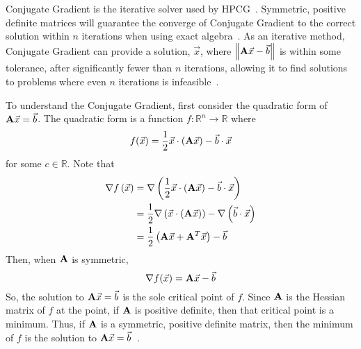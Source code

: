 Conjugate Gradient is the iterative solver used by HPCG~\cite{Dongarra:2015:HPCG}.
Symmetric, positive definite matrices will guarantee the converge of Conjugate Gradient to the correct solution within \(n\) iterations when using exact algebra~\cite{Saad:2003:IterativeMethods}.
As an iterative method, Conjugate Gradient can provide a solution, \(\vec{x}\), where \(\left\|\mathbf{A}\vec{x}-\vec{b}\right\|\) is within some tolerance, after significantly fewer than \(n\) iterations, allowing it to find solutions to problems where even \(n\) iterations is infeasible~\cite{Shewchuk:1994:IntroToCG}.

To understand the Conjugate Gradient, first consider the quadratic form of \(\mathbf{A}\vec{x} = \vec{b}\).
The quadratic form is a function \(f:\mathbb{R}^n\to\mathbb{R}\) where
\begin{equation}
\label{eq:quad-form}
	f(\vec{x}) = \frac{1}{2}\vec{x}\cdot\left(\mathbf{A}\vec{x}\right) - \vec{b}\cdot\vec{x}
\end{equation}
for some \(c\in\mathbb{R}\).
Note that
\begin{align*}
	\nabla f\left(\vec{x}\right)
	&= \nabla \left(\frac{1}{2}\vec{x}\cdot\left(\mathbf{A}\vec{x}\right) - \vec{b}\cdot\vec{x}\right) \\
	&= \frac{1}{2}\nabla \left(\vec{x}\cdot\left(\mathbf{A}\vec{x}\right)\right) - \nabla\left(\vec{b}\cdot\vec{x}\right) \\
	&= \frac{1}{2}\left(\mathbf{A}\vec{x}+\mathbf{A}^T\vec{x}\right)-\vec{b}
\end{align*}
Then, when \(\mathbf{A}\) is symmetric,
\begin{equation*}
	\nabla f(\vec{x}) = \mathbf{A}\vec{x} - \vec{b}
\end{equation*}
So, the solution to \(\mathbf{A}\vec{x} = \vec{b}\) is the sole critical point of \(f\).
Since \(\mathbf{A}\) is the Hessian matrix of \(f\) at the point, if \(\mathbf{A}\) is positive definite, then that critical point is a minimum.
Thus, if \(\mathbf{A}\) is a symmetric, positive definite matrix, then the minimum of \(f\) is the solution to \(\mathbf{A}\vec{x} = \vec{b}\)~\cite{Shewchuk:1994:IntroToCG}.

